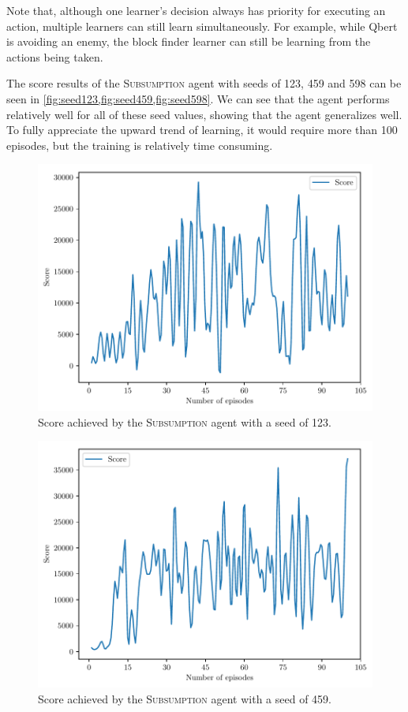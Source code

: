 \documentclass[a4paper,titlepage]{article}
\begin{document}
	Note that, although one learner's decision always has priority for executing an action, multiple learners can still learn simultaneously. For example, while Qbert is avoiding an enemy, the block finder learner can still be learning from the actions being taken.
	
	The score results of the \textsc{Subsumption} agent with seeds of 123, 459 and 598 can be seen in \cref{fig:seed123,fig:seed459,fig:seed598}. We can see that the agent performs relatively well for all of these seed values, showing that the agent generalizes well. To fully appreciate the upward trend of learning, it would require more than 100 episodes, but the training is relatively time consuming.
	
	\begin{figure}[!htb]
		\centering
		\includegraphics[width=\columnwidth]{plots/seed123.pdf}
		\caption
		{Score achieved by the \textsc{Subsumption} agent with a seed of 123.}
		\label{fig:seed123}
	\end{figure}
	
	\begin{figure}[!htb]
		\centering
		\includegraphics[width=\columnwidth]{plots/seed459.pdf}
		\caption
		{Score achieved by the \textsc{Subsumption} agent with a seed of 459.}
		\label{fig:seed459}
	\end{figure}
\end{document}
